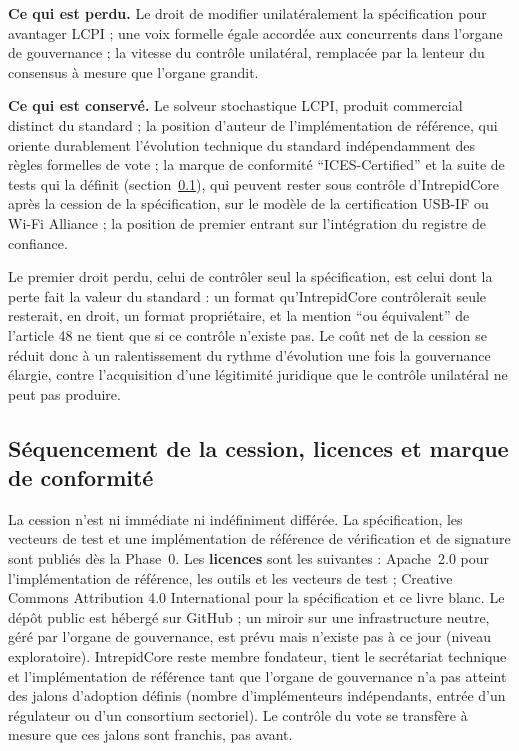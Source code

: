 \documentclass[11pt,a4paper]{article}
\begin{document}
\textbf{Ce qui est perdu.} Le droit de modifier unilatéralement la spécification pour avantager LCPI ; une voix formelle égale accordée aux concurrents dans l'organe de gouvernance ; la vitesse du contrôle unilatéral, remplacée par la lenteur du consensus à mesure que l'organe grandit.

\textbf{Ce qui est conservé.} Le solveur stochastique LCPI, produit commercial distinct du standard ; la position d'auteur de l'implémentation de référence, qui oriente durablement l'évolution technique du standard indépendamment des règles formelles de vote ; la marque de conformité \enquote{ICES-Certified} et la suite de tests qui la définit (section~\ref{sec:conformite}), qui peuvent rester sous contrôle d'IntrepidCore après la cession de la spécification, sur le modèle de la certification USB-IF ou Wi-Fi Alliance ; la position de premier entrant sur l'intégration du registre de confiance.

Le premier droit perdu, celui de contrôler seul la spécification, est celui dont la perte fait la valeur du standard : un format qu'IntrepidCore contrôlerait seule resterait, en droit, un format propriétaire, et la mention \enquote{ou équivalent} de l'article 48 ne tient que si ce contrôle n'existe pas. Le coût net de la cession se réduit donc à un ralentissement du rythme d'évolution une fois la gouvernance élargie, contre l'acquisition d'une légitimité juridique que le contrôle unilatéral ne peut pas produire.

\subsection{Séquencement de la cession, licences et marque de conformité}\label{sec:conformite}

La cession n'est ni immédiate ni indéfiniment différée. La spécification, les vecteurs de test et une implémentation de référence de vérification et de signature sont publiés dès la Phase~0. Les \textbf{licences} sont les suivantes : Apache~2.0 pour l'implémentation de référence, les outils et les vecteurs de test ; Creative Commons Attribution 4.0 International pour la spécification et ce livre blanc. Le dépôt public est hébergé sur GitHub ; un miroir sur une infrastructure neutre, géré par l'organe de gouvernance, est prévu mais n'existe pas à ce jour (niveau exploratoire). IntrepidCore reste membre fondateur, tient le secrétariat technique et l'implémentation de référence tant que l'organe de gouvernance n'a pas atteint des jalons d'adoption définis (nombre d'implémenteurs indépendants, entrée d'un régulateur ou d'un consortium sectoriel). Le contrôle du vote se transfère à mesure que ces jalons sont franchis, pas avant.
\end{document}
